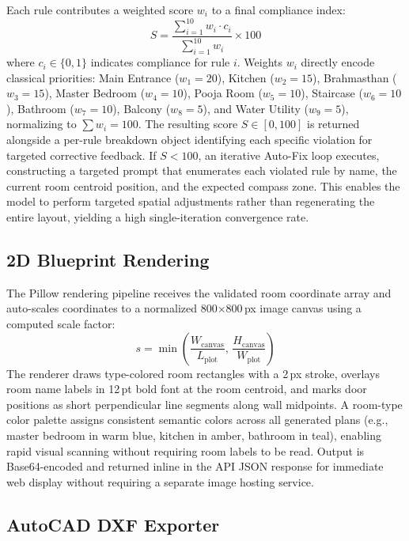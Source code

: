 \documentclass[10pt, twocolumn, letterpaper]{article}
\begin{document}
Each rule contributes a weighted score $w_i$ to a final compliance index:
\begin{equation}
  S = \frac{\sum_{i=1}^{10} w_i \cdot c_i}{\sum_{i=1}^{10} w_i} \times 100
\end{equation}
where $c_i \in \{0, 1\}$ indicates compliance for rule $i$. Weights $w_i$ directly encode classical priorities: Main Entrance ($w_1 = 20$), Kitchen ($w_2 = 15$), Brahmasthan ($w_3 = 15$), Master Bedroom ($w_4 = 10$), Pooja Room ($w_5 = 10$), Staircase ($w_6 = 10$), Bathroom ($w_7 = 10$), Balcony ($w_8 = 5$), and Water Utility ($w_9 = 5$), normalizing to $\sum w_i = 100$. The resulting score $S \in [0, 100]$ is returned alongside a per-rule breakdown object identifying each specific violation for targeted corrective feedback. If $S < 100$, an iterative Auto-Fix loop executes, constructing a targeted prompt that enumerates each violated rule by name, the current room centroid position, and the expected compass zone. This enables the model to perform targeted spatial adjustments rather than regenerating the entire layout, yielding a high single-iteration convergence rate.

\subsection{2D Blueprint Rendering}

The Pillow rendering pipeline receives the validated room coordinate array and
auto-scales coordinates to a normalized 800$\times$800\,px image canvas using
a computed scale factor:
\begin{equation}
  s = \min\!\left(\frac{W_{\text{canvas}}}{L_{\text{plot}}},\,\frac{H_{\text{canvas}}}{W_{\text{plot}}}\right)
\end{equation}
The renderer draws type-colored room rectangles with a 2\,px stroke, overlays
room name labels in 12\,pt bold font at the room centroid, and marks door
positions as short perpendicular line segments along wall midpoints. A
room-type color palette assigns consistent semantic colors across all generated
plans (e.g., master bedroom in warm blue, kitchen in amber, bathroom in teal),
enabling rapid visual scanning without requiring room labels to be read.
Output is Base64-encoded and returned inline in the API JSON response for
immediate web display without requiring a separate image hosting service.

\subsection{AutoCAD DXF Exporter}
\end{document}
